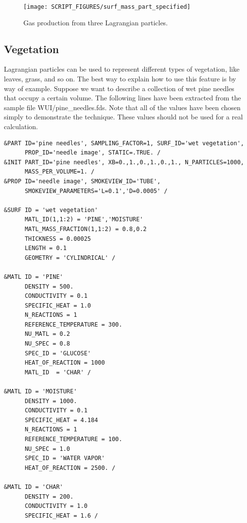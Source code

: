 \documentclass[11pt]{book}
\begin{document}
\begin{figure}[ht]
\begin{center}
\texttt{[image: SCRIPT\_FIGURES/surf\_mass\_part\_specified]}
\end{center}
\caption[Example of specified gas mass production from particles]{Gas production from three Lagrangian particles.}
\label{surf_mass_part_specified_fig}
\end{figure}



\subsection{Vegetation}
\label{info:vegetation}
\label{pine_needles}

Lagrangian particles can be used to represent different types of vegetation, like leaves, grass, and so on. The best way to explain how to use this feature is by way of example. Suppose we want to describe a collection of wet pine needles that occupy a certain volume. The following lines have been extracted from the sample file {\ct WUI/pine\_needles.fds}. Note that all of the values have been chosen simply to demonstrate the technique. These values should not be used for a real calculation.
\begin{lstlisting}
&PART ID='pine needles', SAMPLING_FACTOR=1, SURF_ID='wet vegetation',
      PROP_ID='needle image', STATIC=.TRUE. /
&INIT PART_ID='pine needles', XB=0.,1.,0.,1.,0.,1., N_PARTICLES=1000,
      MASS_PER_VOLUME=1. /
&PROP ID='needle image', SMOKEVIEW_ID='TUBE',
      SMOKEVIEW_PARAMETERS='L=0.1','D=0.0005' /

&SURF ID = 'wet vegetation'
      MATL_ID(1,1:2) = 'PINE','MOISTURE'
      MATL_MASS_FRACTION(1,1:2) = 0.8,0.2
      THICKNESS = 0.00025
      LENGTH = 0.1
      GEOMETRY = 'CYLINDRICAL' /

&MATL ID = 'PINE'
      DENSITY = 500.
      CONDUCTIVITY = 0.1
      SPECIFIC_HEAT = 1.0
      N_REACTIONS = 1
      REFERENCE_TEMPERATURE = 300.
      NU_MATL = 0.2
      NU_SPEC = 0.8
      SPEC_ID = 'GLUCOSE'
      HEAT_OF_REACTION = 1000
      MATL_ID  = 'CHAR' /

&MATL ID = 'MOISTURE'
      DENSITY = 1000.
      CONDUCTIVITY = 0.1
      SPECIFIC_HEAT = 4.184
      N_REACTIONS = 1
      REFERENCE_TEMPERATURE = 100.
      NU_SPEC = 1.0
      SPEC_ID = 'WATER VAPOR'
      HEAT_OF_REACTION = 2500. /

&MATL ID = 'CHAR'
      DENSITY = 200.
      CONDUCTIVITY = 1.0
      SPECIFIC_HEAT = 1.6 /
\end{lstlisting}
\end{document}

